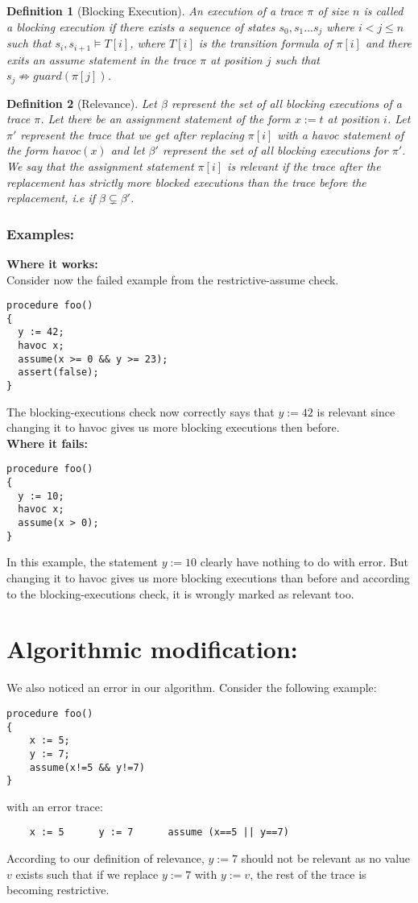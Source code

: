 \documentclass{article}
\newcommand{\limp}{\Rightarrow}
\newtheorem{mydef}{Definition}
\begin{document}
\begin{mydef}[Blocking Execution]\label{mydef:blockingexecution_definition}
An execution of a trace $\pi$ of size $n$ is called a blocking execution if there exists a sequence of states $s_0, s_1...s_j$ where $i<j \leq n$ such that $s_i, s_{i+1} \models T[i]$, where $T[i]$ is the transition formula of $\pi[i]$ and there exits an assume statement in the trace $\pi$ at position $j$ such that $s_{j} \not \limp guard(\pi[j])$.
\end{mydef}

\begin{mydef}[Relevance]\label{mydef:relevancy_definition}
Let $\beta$ represent the set of all blocking executions of a trace $\pi$. Let there be an assignment statement of the form $x:=t$ at position $i$. Let $\pi'$ represent the trace that we get after replacing $\pi[i]$ with a havoc statement of the form $havoc(x)$ and let $\beta'$ represent the set of all blocking executions for $\pi'$.\\
We say that the assignment statement $\pi[i]$ is relevant if the trace after the replacement has strictly more blocked executions than the trace before the replacement, i.e if $\beta \subsetneq \beta'$. 
\end{mydef}
\subsubsection{Examples:}
\textbf{Where it works:}\\
Consider now the failed example from the restrictive-assume check. 
\begin{lstlisting}
procedure foo()
{
  y := 42;
  havoc x;
  assume(x >= 0 && y >= 23);
  assert(false);
}
\end{lstlisting}
The blocking-executions check now correctly says that $y:=42$ is relevant since changing it to havoc gives us more blocking executions then before.\\
\textbf{Where it fails:}
\begin{lstlisting}
procedure foo()
{
  y := 10;
  havoc x;
  assume(x > 0);
}
\end{lstlisting}
In this example, the statement $y:=10$ clearly have nothing to do with error. But changing it to havoc gives us more blocking executions than before and according to the blocking-executions check, it is wrongly marked as relevant too. 

\section{Algorithmic modification:}
We also noticed an error in our algorithm. Consider the following example:
\begin{lstlisting}
procedure foo()
{
	x := 5;
	y := 7;
	assume(x!=5 && y!=7)
}
\end{lstlisting}
with an error trace:
\begin{lstlisting}
	x := 5		y := 7		assume (x==5 || y==7) 
\end{lstlisting}
According to our definition of relevance, $y:=7$ should not be relevant as no value $v$ exists such that if we replace $y:=7$ with $y:=v$, the rest of the trace is becoming restrictive. 
\end{document}
